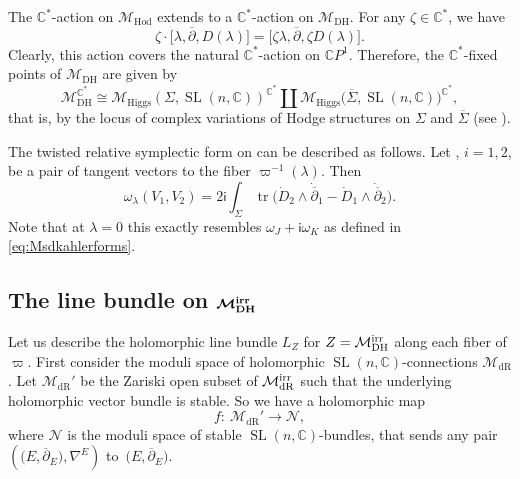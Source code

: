 \documentclass[pdftex]{sigma}
\numberwithin{equation}{section}
\theoremstyle{definition}
\newcommand\C{{\mathbb C}}
\renewcommand{\i}{\mathsf{i}}
\begin{document}
The $\C^*$-action on $\mathcal{M}_{\mathrm{Hod}}$ extends to a $\C^*$-action on $\mathcal{M}_{\mathrm{DH}}$. For any $\zeta \in \C^*$,
we have
\[
\zeta \cdot \big[\lambda, {\overline{\partial}}, D(\lambda) \big] = \big[\zeta \lambda, {\overline{\partial}}, \zeta D(\lambda)\big].
\]
Clearly, this action covers the natural $\C^*$-action on $\mathbb CP^1$.
Therefore, the $\C^*$-fixed points of $\mathcal{M}_{\mathrm{DH}}$ are given by
\[%
\mathcal{M}_{\mathrm{DH}}^{\C^*} \cong \mathcal{M}_{\mathrm{Higgs}}(\Sigma, \operatorname{SL}(n,\C))^{\C^*} \amalg \mathcal{M}_{\mathrm{Higgs}}\bigl(\overline{\Sigma}, \operatorname{SL}(n,\C)\bigr)^{\C^*},
\]
that is, by the locus of complex variations of Hodge structures on $\Sigma$
and $\overline{\Sigma}$ (see \cite{SimpsonIHES1992}).

The twisted relative symplectic form on  can be described as follows. Let
, $i = 1, 2$, be a pair of tangent
vectors to the fiber $\varpi^{-1}(\lambda)$. Then
\begin{equation}\label{eq:omegalambdaMDH}
\omega_\lambda(V_1, V_2) = 2\i\int_\Sigma \operatorname{tr}\bigl(\dot D_2\wedge \dot{\overline{\partial}}_1-\dot D_1\wedge\dot{\overline{\partial}}_2\bigr).
\end{equation}
Note that at $\lambda = 0$ this exactly resembles $\omega_J +\i \omega_K$ as defined in \eqref{eq:Msdkahlerforms}.

\subsection[The line bundle on M\_DH\^{}irr]{The line bundle on $\boldsymbol{\mathcal{M}_{\mathrm{DH}}^{\rm irr}}$}\label{ss:thelinebundleonMDH}

Let us describe the holomorphic line bundle $L_Z$ for $Z = \mathcal{M}_{\mathrm{DH}}^{\rm irr}$ along each fiber of
$\varpi$. First consider the moduli space of holomorphic $\operatorname{SL}(n,\C)$-connections $\mathcal{M}_{\mathrm{dR}}$. Let $\mathcal{M}_{\mathrm{dR}}'$ be the Zariski open subset of $\mathcal{M}_{\mathrm{dR}}^{\rm irr}$ such that the underlying holomorphic vector
bundle is stable. So we have a holomorphic map \[ f\colon \ \mathcal{M}_{\mathrm{dR}}' \longrightarrow
\mathcal{N} , \] where $\mathcal{N}$ is the moduli space of stable
$\operatorname{SL}(n,\C)$-bundles, that sends any pair $(\bigl(E, {\overline{\partial}}_E\bigr), \nabla^E)$ to~$\bigl(E, {\overline{\partial}}_E\bigr)$.
\end{document}
